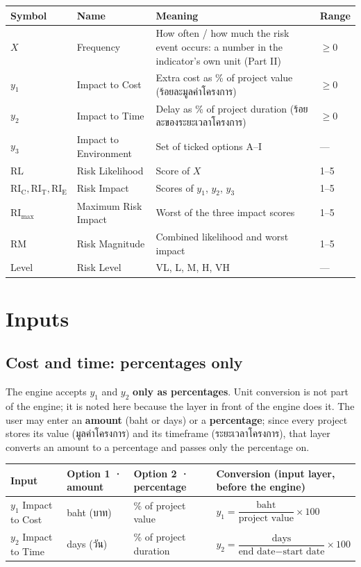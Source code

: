 \documentclass[10pt,a4paper]{article}
\newcommand{\RL}{\mathrm{RL}}\newcommand{\RIC}{\mathrm{RI_C}}\newcommand{\RIT}{\mathrm{RI_T}}\newcommand{\RIE}{\mathrm{RI_E}}
\newcommand{\RImax}{\mathrm{RI}_{\max}}\newcommand{\RM}{\mathrm{RM}}
\begin{document}
\begin{tabularx}{\linewidth}{@{}l l X l@{}}
\toprule
Symbol & Name & Meaning & Range\\\midrule
$X$ & Frequency & How often / how much the risk event occurs: a number in the indicator's own unit (Part II) & $\ge0$\\
$y_1$ & Impact to Cost & Extra cost as \% of project value (ร้อยละมูลค่าโครงการ) & $\ge0$\\
$y_2$ & Impact to Time & Delay as \% of project duration (ร้อยละของระยะเวลาโครงการ) & $\ge0$\\
$y_3$ & Impact to Environment & Set of ticked options A--I & ---\\
$\RL$ & Risk Likelihood & Score of $X$ & 1--5\\
$\RIC,\RIT,\RIE$ & Risk Impact & Scores of $y_1$, $y_2$, $y_3$ & 1--5\\
$\RImax$ & Maximum Risk Impact & Worst of the three impact scores & 1--5\\
$\RM$ & Risk Magnitude & Combined likelihood and worst impact & 1--5\\
Level & Risk Level & VL, L, M, H, VH & ---\\
\bottomrule
\end{tabularx}

\section{Inputs}\label{sec:inp}
\subsection*{Cost and time: percentages only}
The engine accepts $y_1$ and $y_2$ \textbf{only as percentages}. Unit conversion is not part of the engine; it is noted here because the layer in front of the engine does it. The user may enter an \textbf{amount} (baht or days) or a \textbf{percentage}; since every project stores its value (มูลค่าโครงการ) and its timeframe (ระยะเวลาโครงการ), that layer converts an amount to a percentage and passes only the percentage on.

\begin{center}
\renewcommand{\arraystretch}{1.5}
\begin{tabular}{@{}l l l l@{}}
\toprule
Input & Option 1 · amount & Option 2 · percentage & Conversion (input layer, before the engine)\\\midrule
$y_1$ Impact to Cost & baht (บาท) & \% of project value & $y_1=\dfrac{\text{baht}}{\text{project value}}\times100$\\[10pt]
$y_2$ Impact to Time & days (วัน) & \% of project duration & $y_2=\dfrac{\text{days}}{\text{end date}-\text{start date}}\times100$\\
\bottomrule
\end{tabular}
\end{center}
\end{document}
